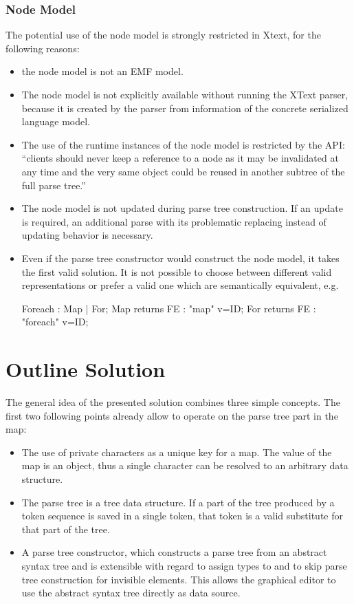 \subsubsection{Node Model}
The potential use of the node model is strongly restricted in Xtext, for the following reasons:
\begin{itemize}
	\item the node model is not an EMF model. 
	\item The node model is not explicitly available without running the XText parser, because it is created by the parser from information of the concrete serialized language model. 
	\item The use of the runtime instances of the node model is restricted by the API: ``clients should never keep a reference to a node as it may be invalidated at any time and the very same object could be reused in another subtree of the full parse tree.''\cite{XTextAPI}
	\item The node model is not updated during parse tree construction. If an update is required, an additional parse with its problematic replacing instead of updating behavior is necessary.
	\item Even if the parse tree constructor would construct the node model, it takes the first valid solution. It is not possible to choose between different valid representations or prefer a valid one which are semantically equivalent, e.g.
\begin{xtxt}
Foreach 		: 	Map | For;
Map returns FE  	:  	"map" 		v=ID;
For returns FE  	: 	"foreach"	v=ID;
\end{xtxt}
\end{itemize}


\section{Outline Solution}
The general idea of the presented solution combines three simple concepts. The first two following points already allow to operate on the parse tree part in the map:
\begin{itemize}
	\item The use of private characters as a unique key for a map. The value of the map is an object, thus a single character can be resolved to an arbitrary data structure.
	\item The parse tree is a tree data structure. If a part of the tree produced by a token sequence is saved in a single token, that token is a valid substitute for that part of the tree.
	\item A parse tree constructor, which constructs a parse tree from an abstract syntax tree and is extensible with regard to assign types to and to skip parse tree construction for invisible elements. This allows the graphical editor to use the abstract syntax tree directly as data source. 
\end{itemize}

